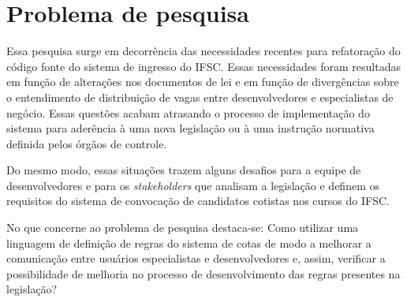 \section{Problema de pesquisa}
\label{problema}

Essa pesquisa surge em decorrência das necessidades recentes para refatoração do código fonte do sistema de ingresso do \gls{IFSC}. Essas necessidades foram resultadas em função de alterações nos documentos de lei e em função de  divergências sobre o entendimento de distribuição de vagas entre desenvolvedores e especialistas de negócio. Essas questões acabam atrasando o processo de implementação do sistema para aderência à uma nova legislação ou à uma instrução normativa definida pelos órgãos de controle.

Do mesmo modo, essas situações trazem alguns desafios para a equipe de desenvolvedores e para os \textit{stakeholders} que analisam a legislação e definem os requisitos do sistema de convocação de candidatos cotistas nos cursos do \gls{IFSC}. 

No que concerne ao problema de pesquisa destaca-se: 
Como utilizar uma linguagem de definição de regras do sistema de cotas de modo a melhorar a comunicação entre usuários especialistas e desenvolvedores e, assim, verificar a possibilidade de melhoria no processo de desenvolvimento das regras presentes na legislação?
